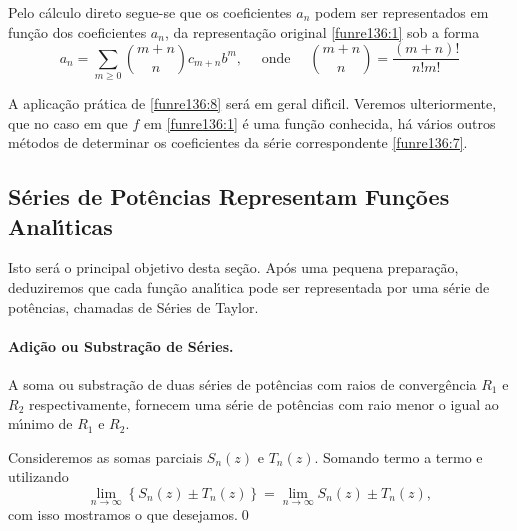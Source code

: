 Pelo c\'{a}lculo direto segue-se que os coeficientes $a_n$ podem ser
representados em fun\c{c}\~{a}o dos coeficientes $a_n$, da representa\c{c}\~{a}o
original \eqref{funre136:1} sob a forma
\begin{equation}\label{funre136:8}
  a_n=\sum_{m\geq 0}{m+n\choose n }c_{m+n}b^m,\quad \text{ onde }\quad {m+n\choose n}=
  \frac{(m+n)!}{n!m!}
\end{equation}

A aplica\c{c}\~{a}o pr\'{a}tica de \eqref{funre136:8} ser\'{a} em geral dif\'{\i}cil.
Veremos ulteriormente, que no caso em que $f$ em
\eqref{funre136:1} \'{e} uma fun\c{c}\~{a}o conhecida, h\'{a} v\'{a}rios outros
m\'{e}todos de determinar os coeficientes da s\'{e}rie correspondente
\eqref{funre136:7}.

\subsection{S\'{e}ries de Pot\^{e}ncias Representam Fun\c{c}\~{o}es Anal\'{\i}ticas}

Isto ser\'{a} o principal objetivo desta se\c{c}\~{a}o. Ap\'{o}s uma pequena
prepara\c{c}\~{a}o, deduziremos que cada fun\c{c}\~{a}o anal\'{\i}tica pode ser
representada por uma s\'{e}rie de pot\^{e}ncias, chamadas de S\'{e}ries de
Taylor.

\paragraph{Adi\c{c}\~{a}o ou Substra\c{c}\~{a}o de S\'{e}ries.}
A soma ou substra\c{c}\~{a}o de duas s\'{e}ries de pot\^{e}ncias com raios de
converg\^{e}ncia $R_1$ e $R_2$ respectivamente, fornecem uma s\'{e}rie de
pot\^{e}ncias com raio  menor o igual ao m\'{\i}nimo de $R_1$ e $R_2$.

\begin{prova} Consideremos as somas parciais $S_n(z)$ e $T_n(z)$. Somando termo
a termo e utilizando
\begin{equation*}
    \lim_{n\to\infty}\left\{S_n(z)\pm
    T_n(z)\right\}=\lim_{n\to\infty}S_n(z)\pm T_n(z),
\end{equation*}
com isso mostramos o que desejamos.\qed
\end{prova}

